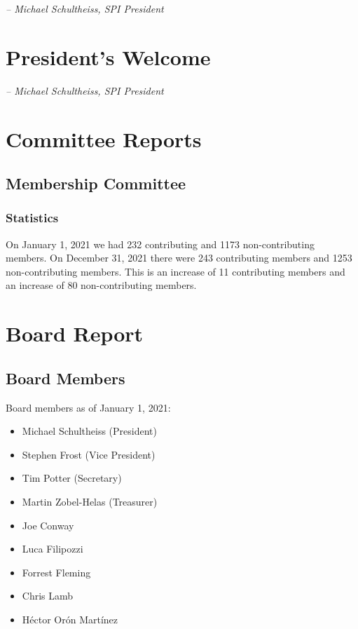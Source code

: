 \documentclass[a4paper]{report}
\begin{document}
  \emph{-- Michael Schultheiss, SPI President}

\newpage

\tableofcontents

\newpage

\chapter{President's Welcome}
\label{sec:president}

  \emph{-- Michael Schultheiss, SPI President}

\chapter{Committee Reports}
\section{Membership Committee}

\subsection{Statistics}

On January 1, 2021 we had 232 contributing and 1173 non-contributing members.  On December 31, 2021 there were 243 contributing members and 1253 non-contributing members.  This is an increase of 11 contributing members and an increase of 80 non-contributing members.

\chapter{Board Report}
\section{Board Members}

Board members as of January 1, 2021:

\begin{itemize}
\item Michael Schultheiss (President)
\item Stephen Frost (Vice President)
\item Tim Potter (Secretary)
\item Martin Zobel-Helas (Treasurer)
\item Joe Conway
\item Luca Filipozzi
\item Forrest Fleming
\item Chris Lamb
\item Héctor Orón Martínez
\end{itemize}
\end{document}
